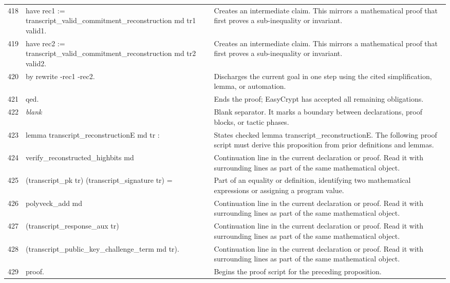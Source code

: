 \documentclass[10pt]{article}
\begin{document}
\begin{longtable}{r L{0.53\textwidth} L{0.37\textwidth}}
418 & {\ttfamily\scriptsize have rec1 := transcript\_valid\_commitment\_reconstruction md tr1 valid1.} & Creates an intermediate claim.  This mirrors a mathematical proof that first proves a sub-inequality or invariant. \\
419 & {\ttfamily\scriptsize have rec2 := transcript\_valid\_commitment\_reconstruction md tr2 valid2.} & Creates an intermediate claim.  This mirrors a mathematical proof that first proves a sub-inequality or invariant. \\
420 & {\ttfamily\scriptsize by rewrite -rec1 -rec2.} & Discharges the current goal in one step using the cited simplification, lemma, or automation. \\
421 & {\ttfamily\scriptsize qed.} & Ends the proof; EasyCrypt has accepted all remaining obligations. \\
422 & {\ttfamily\scriptsize \emph{blank}} & Blank separator.  It marks a boundary between declarations, proof blocks, or tactic phases. \\
423 & {\ttfamily\scriptsize lemma transcript\_reconstructionE md tr :} & States checked lemma transcript\_reconstructionE.  The following proof script must derive this proposition from prior definitions and lemmas. \\
424 & {\ttfamily\scriptsize   verify\_reconstructed\_highbits md} & Continuation line in the current declaration or proof.  Read it with surrounding lines as part of the same mathematical object. \\
425 & {\ttfamily\scriptsize     (transcript\_pk tr) (transcript\_signature tr) =} & Part of an equality or definition, identifying two mathematical expressions or assigning a program value. \\
426 & {\ttfamily\scriptsize   polyveck\_add md} & Continuation line in the current declaration or proof.  Read it with surrounding lines as part of the same mathematical object. \\
427 & {\ttfamily\scriptsize     (transcript\_response\_aux tr)} & Continuation line in the current declaration or proof.  Read it with surrounding lines as part of the same mathematical object. \\
428 & {\ttfamily\scriptsize     (transcript\_public\_key\_challenge\_term md tr).} & Continuation line in the current declaration or proof.  Read it with surrounding lines as part of the same mathematical object. \\
429 & {\ttfamily\scriptsize proof.} & Begins the proof script for the preceding proposition. \\

\end{longtable}
\end{document}
